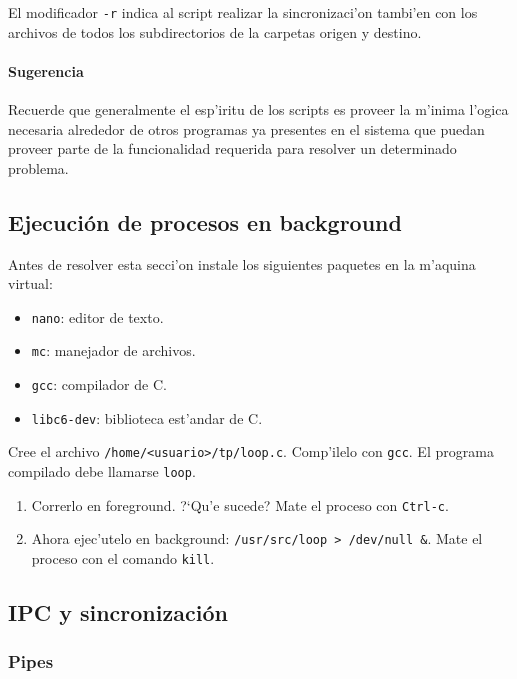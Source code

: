 El modificador \texttt{-r} indica al script realizar la sincronizaci'on tambi'en con los archivos de todos los
subdirectorios de la carpetas origen y destino.


\paragraph{Sugerencia}

Recuerde que generalmente el esp'iritu de los scripts es proveer la m'inima l'ogica necesaria alrededor de otros programas
ya presentes en el sistema que puedan proveer parte de la funcionalidad requerida para resolver un determinado problema.

\subsection{Ejecuci\'on de procesos en background}

Antes de resolver esta secci'on instale los siguientes paquetes en la m'aquina virtual:

\begin{itemize}
\item \texttt{nano}: editor de texto.
\item \texttt{mc}: manejador de archivos.
\item \texttt{gcc}: compilador de C.
\item \texttt{libc6-dev}: biblioteca est'andar de C.
\end{itemize}

Cree el archivo \texttt{/home/<usuario>/tp/loop.c}. Comp'ilelo con \texttt{gcc}. El programa compilado debe llamarse
\texttt{loop}.


\begin{enumerate}
\item Correrlo en foreground. ?`Qu'e sucede? Mate el proceso con \texttt{Ctrl-c}.
\item Ahora ejec'utelo en background: \texttt{/usr/src/loop > /dev/null \&}. Mate el proceso con el comando \texttt{kill}.
\end{enumerate}

\subsection{IPC y sincronizaci\'on}

\subsubsection{Pipes}

